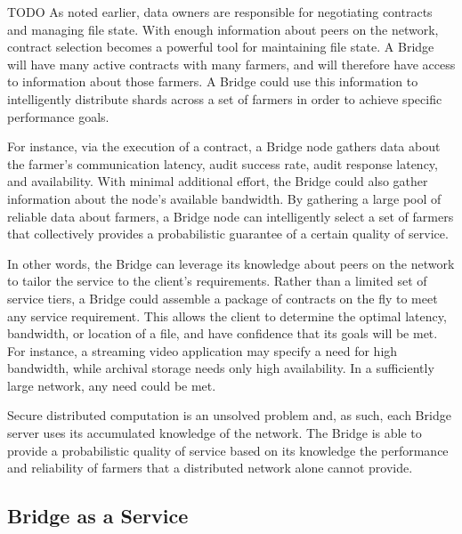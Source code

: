 \documentclass[a4paper,10pt]{article}
\newcommand{\todo}[1]{{\color{red} TODO #1}}
\begin{document}
\todo{
As noted earlier, data owners are responsible for negotiating contracts and
managing file state. With enough information about peers on the network,
contract selection becomes a powerful tool for maintaining file state. A Bridge
will have many active contracts with many farmers, and will therefore have
access to information about those farmers. A Bridge could use this information
to intelligently distribute shards across a set of farmers in order to achieve
specific performance goals.

For instance, via the execution of a contract, a Bridge node gathers data about
the farmer’s communication latency, audit success rate, audit response latency,
and availability. With minimal additional effort, the Bridge could also gather
information about the node’s available bandwidth. By gathering a large pool of
reliable data about farmers, a Bridge node can intelligently select a set of
farmers that collectively provides a probabilistic guarantee of a certain
quality of service.

In other words, the Bridge can leverage its knowledge about peers on the network
to tailor the service to the client’s requirements. Rather than a limited set of
service tiers, a Bridge could assemble a package of contracts on the fly to meet
any service requirement. This allows the client to determine the optimal
latency, bandwidth, or location of a file, and have confidence that its goals
will be met. For instance, a streaming video application may specify a need for
high bandwidth, while archival storage needs only high availability. In a
sufficiently large network, any need could be met.

Secure distributed computation is an unsolved problem and, as such, each Bridge
server uses its accumulated knowledge of the network. The Bridge is able to
provide a probabilistic quality of service based on its knowledge the
performance and reliability of farmers that a distributed network alone cannot
provide.
}

\subsection{Bridge as a Service}
\end{document}
